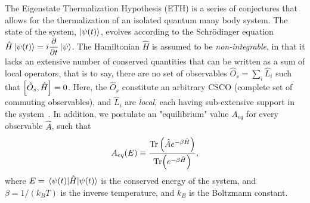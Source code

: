 \documentclass[%
reprint,
superscriptaddress,
amsmath,amssymb,
aps,
prb,
showkeys,
]{revtex4-2}
\begin{document}
The Eigenstate Thermalization Hypothesis (ETH) is a series of conjectures that allows for the thermalization of an isolated quantum many body system. The state of the system, $\ket{\psi(t)}$, evolves according to the Schr\"odinger equation $\hat{H}\ket{\psi(t)} = i\displaystyle\frac{\partial}{\partial t}\ket{\psi}$. The Hamiltonian $\hat{H}$ is assumed to be \textit{non-integrable}, in that  {it lacks an extensive number of conserved quantities that can be written as a sum of local operators, that is to say, there are no set of observables   $\hat{O}_s = \sum_i \hat{L}_i$ such that $\comm{\hat{O}_s}{\hat{H}}=0$. Here, the $\hat{O}_s$ constitute an arbitrary CSCO (complete set of commuting observables), and $\hat{L}_i$ are \textit{local}, each having sub-extensive support in the system}~\cite{Sutherland2004}. In addition, we postulate an "equilibrium" value $A_{eq}$ for every observable $\hat{A}$, such that
\begin{equation}
	\label{eq:aeq}
	A_{eq}(E)\equiv \frac{\Tr \left(\hat{A}e^{-\beta \hat{H}}\right)}{\Tr(e^{-\beta \hat{H}})},
\end{equation}
where $E=\expval{\hat{H}}{\psi(t)}$ is the conserved energy of the system, and $\beta = 1/(k_B T)$ is the inverse temperature, and $k_B$ is the Boltzmann constant.
\end{document}
